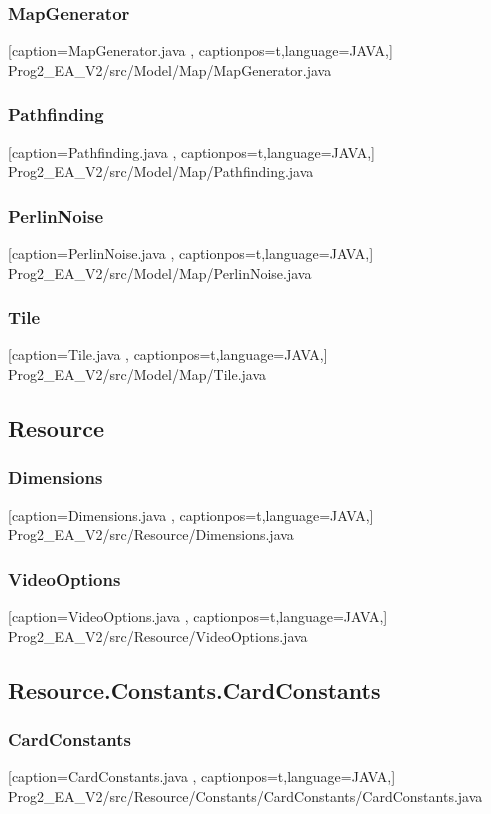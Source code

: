 \documentclass[a4paper,12pt]{scrartcl}
\begin{document}
	\subsubsection{MapGenerator}
	
	[caption={MapGenerator.java}
	\label{lst:javaclass},
	captionpos=t,language=JAVA,]
	{Prog2_EA_V2/src/Model/Map/MapGenerator.java}
	\subsubsection{Pathfinding}
	
	[caption={Pathfinding.java}
	\label{lst:javaclass},
	captionpos=t,language=JAVA,]
	{Prog2_EA_V2/src/Model/Map/Pathfinding.java}
	\subsubsection{PerlinNoise}
	
	[caption={PerlinNoise.java}
	\label{lst:javaclass},
	captionpos=t,language=JAVA,]
	{Prog2_EA_V2/src/Model/Map/PerlinNoise.java}
	\subsubsection{Tile}
	
	[caption={Tile.java}
	\label{lst:javaclass},
	captionpos=t,language=JAVA,]
	{Prog2_EA_V2/src/Model/Map/Tile.java}
	\subsection{Resource}
	\subsubsection{Dimensions}
	
	[caption={Dimensions.java}
	\label{lst:javaclass},
	captionpos=t,language=JAVA,]
	{Prog2_EA_V2/src/Resource/Dimensions.java}
	\subsubsection{VideoOptions}
	
	[caption={VideoOptions.java}
	\label{lst:javaclass},
	captionpos=t,language=JAVA,]
	{Prog2_EA_V2/src/Resource/VideoOptions.java}
	\subsection{Resource.Constants.CardConstants}
	\subsubsection{CardConstants}
	
	[caption={CardConstants.java}
	\label{lst:javaclass},
	captionpos=t,language=JAVA,]
	{Prog2_EA_V2/src/Resource/Constants/CardConstants/CardConstants.java}
\end{document}

